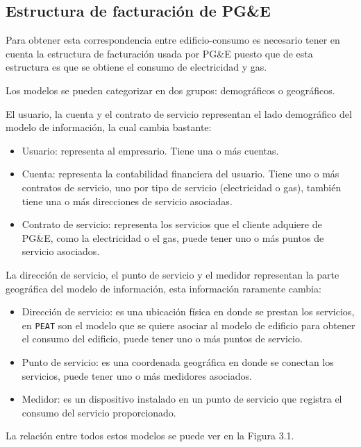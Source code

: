 \subsection{Estructura de facturación de PG\&E}
Para obtener esta correspondencia entre edificio-consumo es necesario
tener en cuenta la estructura de facturación usada por PG\&E puesto
que de esta estructura es que se obtiene el consumo de electricidad y gas.

Los modelos se pueden categorizar en dos grupos: demográficos o geográficos.

El usuario, la cuenta y el contrato de servicio representan el lado demográfico
del modelo de información, la cual cambia bastante:

\begin{itemize}
\item Usuario: representa al empresario. Tiene una o más cuentas.
\item Cuenta: representa la contabilidad financiera del usuario. Tiene uno o más
  contratos de servicio, uno por tipo de servicio (electricidad o gas), también
  tiene una o más direcciones de servicio asociadas.
\item Contrato de servicio: representa los servicios que el cliente adquiere
  de PG\&E, como la electricidad o el gas, puede tener uno o más puntos
  de servicio asociados.
\end{itemize}

La dirección de servicio, el punto de servicio y el medidor representan
la parte geográfica del modelo de información, esta información raramente cambia:

\begin{itemize}
\item Dirección de servicio: es una ubicación física en donde se prestan los
  servicios, en \texttt{PEAT} son el modelo que se quiere asociar al modelo
  de edificio para obtener el consumo del edificio, puede tener uno o más puntos
  de servicio.
\item Punto de servicio: es una coordenada geográfica en donde se conectan los
  servicios, puede tener uno o más medidores asociados.
\item Medidor: es un dispositivo instalado en un punto de servicio que registra el
  consumo del servicio proporcionado.
\end{itemize}

La relación entre todos estos modelos se puede ver en la Figura 3.1.


